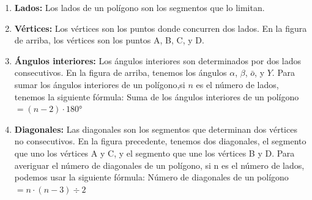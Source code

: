 \begin{enumerate}
	\item \textbf{Lados:} Los lados de un polígono son los segmentos que lo limitan.
	\item \textbf{Vértices:} Los vértices son los puntos donde concurren dos lados. En la figura de arriba, los vértices son los puntos A, B, C, y D.
	\item \textbf{Ángulos interiores:} Los ángulos interiores son determinados por dos lados consecutivos. En la figura de arriba, tenemos los ángulos $\alpha$, $\beta$, $\bar{o}$, y $Y$. Para sumar los ángulos interiores de un polígono,si $n$ es el número de lados, tenemos la siguiente fórmula: Suma de los ángulos interiores de un polígono $= (n - 2) \cdot 180°$
	\item \textbf{Diagonales:} Las diagonales son los segmentos que determinan dos vértices no consecutivos. En la figura precedente, tenemos dos diagonales, el segmento que uno los vértices A y C, y el segmento que une los vértices B y D. Para averiguar el número de diagonales de un polígono, si n es el número de lados, podemos usar la siguiente fórmula: Número de diagonales de un polígono $= n \cdot (n - 3) \div 2$
\end{enumerate}